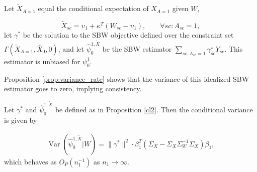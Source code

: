 \begin{proposition}\label{cl2}
Let $\tilde{X}_{A=1}$ equal the conditional expectation of $X_{A=1}$ given $W$,

\[ \tilde{X}_{sc} = \upsilon_1 + \kappa^T (W_{sc} - \upsilon_1), \qquad \forall sc: A_{sc} = 1,\] let $\gamma^*$ be the solution to the SBW objective defined over the constraint set $\Gamma(\tilde{X}_{A=1}, \bar{X}_0, 0)$, and let $\hat{\psi}^{1, \tilde{X}}_0$ be the SBW estimator $\sum_{sc: A_{sc} = 1}\gamma^\star_{sc}Y_{sc}$. This estimator is unbiased for $\psi_0^1$.
\end{proposition}



Proposition \ref{prop:variance_rate} shows that the variance of this idealized SBW estimator goes to zero, implying consistency. 
\begin{proposition}\label{prop:variance_rate}
Let $\gamma^*$ and $\hat{\psi}_0^{1,\tilde{X}}$ be defined as in Proposition \ref{cl2}. Then the conditional variance is given by

\begin{align*}
\operatorname{Var}\left( \hat{\psi}_0^{1,\tilde{X}} | W\right)  = \|\gamma^*\|^2 \cdot \beta_1^T(\Sigma_{X} - \Sigma_{X}\Sigma_{W}^{-1}\Sigma_{X})\beta_1, 
\end{align*}
which behaves as $O_P(n_1^{-1})$ as $n_1 \rightarrow \infty$.
\end{proposition}





%

